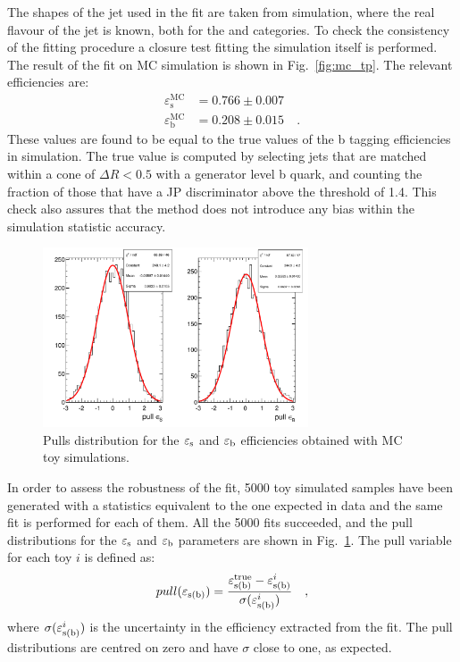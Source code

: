 The \pt shapes of the \probe jet used in the fit are taken from simulation, where the real flavour of the jet is known, both for the \tpp and \tfp categories. To check the consistency of the fitting procedure a closure test fitting the simulation itself is performed.
The result of the fit on MC simulation is shown in Fig.~\ref{fig:mc_tp}. The relevant efficiencies are:
\begin{equation}
\begin{split}
\varepsilon_\mathrm{s}^\mathrm{MC} &= 0.766\pm0.007 \\
\varepsilon_\mathrm{b}^\mathrm{MC} &= 0.208\pm0.015 \quad .
\end{split}
\end{equation}
These values are found to be equal to the true values of the b tagging efficiencies in simulation. The true value is computed by selecting jets that are matched within a cone of $\Delta{R}<0.5$ with a generator level b quark, and counting the fraction of those that have a JP discriminator above the threshold of 1.4. This check also assures that the \tp method does not introduce any bias within the simulation statistic accuracy.

\begin{figure}[htb]
\centering
\includegraphics[width=0.7\textwidth]{images/pulls_mc.pdf}
\caption{Pulls distribution for the $\varepsilon_{\rm s}$ and $\varepsilon_{\rm b}$ efficiencies obtained with MC toy simulations.\label{fig:pullstp}}
\end{figure}

In order to assess the robustness of the fit, 5000 toy simulated samples have been generated with a statistics equivalent to the one expected in data and the same fit is performed for each of them. All the 5000 fits succeeded, and the pull distributions for the $\varepsilon_{\rm s}$ and $\varepsilon_{\rm b}$ parameters are shown in Fig.~\ref{fig:pullstp}. The pull variable for each toy $i$ is defined as:
\begin{equation}
pull(\varepsilon_{\rm s (b)}) = \frac{\varepsilon_{\rm s (b)}^{\rm true} - \varepsilon_{\rm s (b)}^{i}}{\sigma(\varepsilon_{\rm s (b)}^{i})} \quad,
\end{equation}
\noindent where $\sigma(\varepsilon_{\rm s (b)}^{i})$ is the uncertainty in the efficiency extracted from the fit. The pull distributions are centred on zero and have $\sigma$ close to one, as expected.

